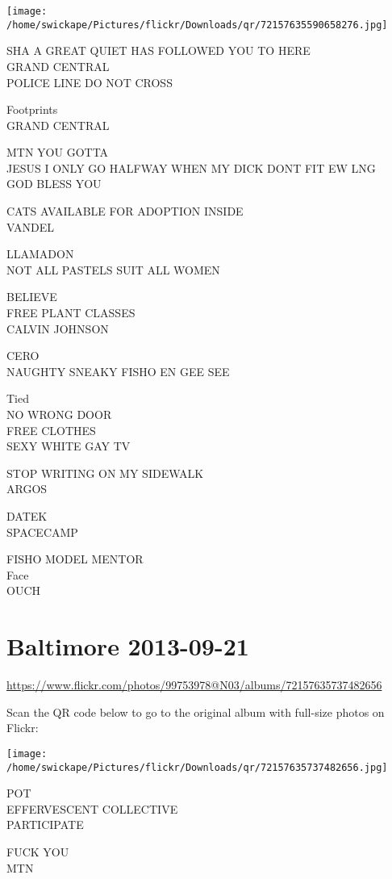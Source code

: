 \documentclass[10pt,letterpaper]{article}
\begin{document}
\texttt{[image: /home/swickape/Pictures/flickr/Downloads/qr/72157635590658276.jpg]}


SHA A GREAT QUIET HAS FOLLOWED YOU TO HERE\\
GRAND CENTRAL\\
POLICE LINE DO NOT CROSS

Footprints\\
GRAND CENTRAL

MTN YOU GOTTA\\
JESUS I ONLY GO HALFWAY WHEN MY DICK DONT FIT EW LNG\\
GOD BLESS YOU

CATS AVAILABLE FOR ADOPTION INSIDE\\
VANDEL

LLAMADON\\
NOT ALL PASTELS SUIT ALL WOMEN

BELIEVE\\
FREE PLANT CLASSES\\
CALVIN JOHNSON

CERO\\
NAUGHTY SNEAKY FISHO EN GEE SEE

Tied\\
NO WRONG DOOR\\
FREE CLOTHES\\
SEXY WHITE GAY TV

STOP WRITING ON MY SIDEWALK\\
ARGOS

DATEK\\
SPACECAMP

FISHO MODEL MENTOR\\
Face\\
OUCH


\section*{Baltimore 2013-09-21}

\url{https://www.flickr.com/photos/99753978@N03/albums/72157635737482656}

Scan the QR code below to go to the original album with full-size photos on Flickr:

\texttt{[image: /home/swickape/Pictures/flickr/Downloads/qr/72157635737482656.jpg]}


POT\\
EFFERVESCENT COLLECTIVE\\
PARTICIPATE

FUCK YOU\\
MTN
\end{document}
